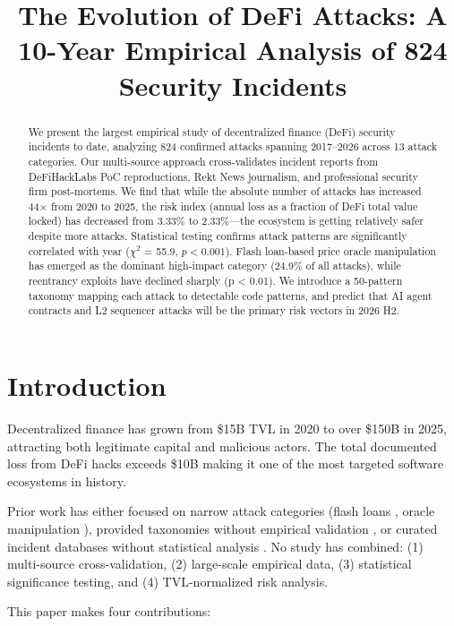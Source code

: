 \documentclass[10pt,conference]{IEEEtran}
\title{The Evolution of DeFi Attacks: A 10-Year Empirical Analysis of 824 Security Incidents}
\author{
  \IEEEauthorblockN{Shiqiang Chen}
  \IEEEauthorblockA{Independent Security Researcher\\
  GitHub: \texttt{Shiqiang Chen}\\
  Email: \texttt{Shiqiang Chen@github}}
}
\begin{document}
\maketitle

\begin{abstract}
We present the largest empirical study of decentralized finance (DeFi) security incidents to date, analyzing 824 confirmed attacks spanning 2017–2026 across 13 attack categories. Our multi-source approach cross-validates incident reports from DeFiHackLabs PoC reproductions, Rekt News journalism, and professional security firm post-mortems. We find that while the absolute number of attacks has increased 44× from 2020 to 2025, the risk index (annual loss as a fraction of DeFi total value locked) has decreased from 3.33\% to 2.33\%—the ecosystem is getting relatively safer despite more attacks. Statistical testing confirms attack patterns are significantly correlated with year ($\chi^2$ = 55.9, $p < 0.001$). Flash loan-based price oracle manipulation has emerged as the dominant high-impact category (24.9\% of all attacks), while reentrancy exploits have declined sharply (p < 0.01). We introduce a 50-pattern taxonomy mapping each attack to detectable code patterns, and predict that AI agent contracts and L2 sequencer attacks will be the primary risk vectors in 2026 H2.
\end{abstract}

\section{Introduction}

Decentralized finance has grown from \$15B TVL in 2020 to over \$150B in 2025, attracting both legitimate capital and malicious actors. The total documented loss from DeFi hacks exceeds \$10B making it one of the most targeted software ecosystems in history.

Prior work has either focused on narrow attack categories (flash loans \cite{qin2021quantifying}, oracle manipulation \cite{zhou2022defi}), provided taxonomies without empirical validation \cite{werner2023sok}, or curated incident databases without statistical analysis \cite{slowmist2021, rekt2020}. No study has combined: (1) multi-source cross-validation, (2) large-scale empirical data, (3) statistical significance testing, and (4) TVL-normalized risk analysis.

This paper makes four contributions:
\end{document}
